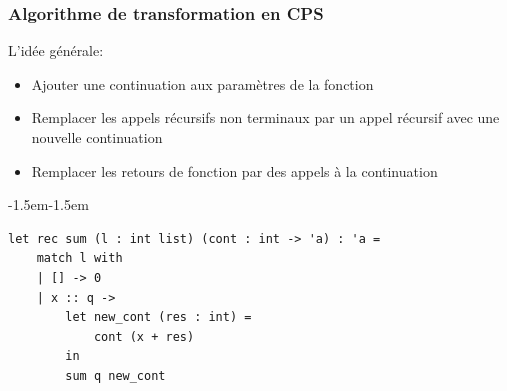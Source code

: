 \addtocounter{framenumber}{-1}
\begin{frame}[fragile,t]
    \frametitle{Algorithme de transformation en CPS}

    L'idée générale:
    \begin{itemize}
        \item Ajouter une continuation aux paramètres de la fonction
        \item[\textcolor{orange}{$\blacktriangleright$}] Remplacer les appels récursifs non terminaux par un appel récursif
              avec une nouvelle continuation
        \item Remplacer les retours de fonction par des appels à la continuation
    \end{itemize}

    \vspace{0.1cm}

    \begin{adjustwidth}{-1.5em}{-1.5em}
        \begin{verbatim}
let rec sum (l : int list) (cont : int -> 'a) : 'a =
    match l with
    | [] -> 0
    | x :: q -> 
        let new_cont (res : int) =
            cont (x + res)
        in
        sum q new_cont
        \end{verbatim}
    \end{adjustwidth}

\end{frame}

